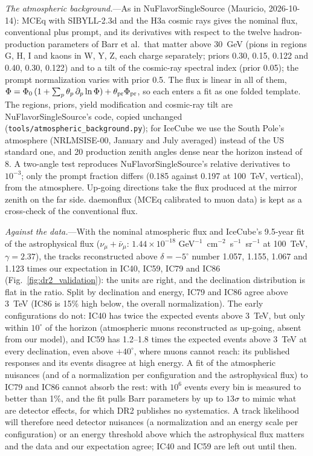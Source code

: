 \documentclass[11pt,a4paper]{article}
\newcommand{\file}[1]{\nolinkurl{#1}}
\begin{document}
\textit{The atmospheric background.}---As in NuFlavorSingleSource (Mauricio, 2026-10-14): MCEq with SIBYLL-2.3d and
the H3a cosmic rays gives the nominal flux, conventional plus prompt, and its derivatives with respect to the
twelve hadron-production parameters of Barr et al.\ that matter above 30~GeV (pions in regions G, H, I and kaons
in W, Y, Z, each charge separately; priors 0.30, 0.15, 0.122 and 0.40, 0.30, 0.122) and to a tilt of the cosmic-ray
spectral index (prior 0.05); the prompt normalization varies with prior 0.5. The flux is linear in all of them,
$\Phi = \Phi_0\,(1 + \sum_p \theta_p\, \partial_p \ln\Phi) + \theta_{\rm pr}\Phi_{\rm pr}$, so each enters a fit as one
folded template. The regions, priors, yield modification and cosmic-ray tilt are NuFlavorSingleSource's code,
copied unchanged (\file{tools/atmospheric\_background.py}); for IceCube we use the South Pole's atmosphere
(NRLMSISE-00, January and July averaged) instead of the US standard one, and 20 production zenith angles dense near
the horizon instead of 8. A two-angle test reproduces NuFlavorSingleSource's relative derivatives to $10^{-3}$;
only the prompt fraction differs (0.185 against 0.197 at 100~TeV, vertical), from the atmosphere. Up-going
directions take the flux produced at the mirror zenith on the far side. daemonflux (MCEq calibrated to muon data)
is kept as a cross-check of the conventional flux.

\textit{Against the data.}---With the nominal atmospheric flux and IceCube's 9.5-year fit of the astrophysical
flux ($\nu_\mu+\bar\nu_\mu$: $1.44\times10^{-18}$ GeV$^{-1}$~cm$^{-2}$~s$^{-1}$~sr$^{-1}$ at 100~TeV, $\gamma = 2.37$),
the tracks reconstructed above $\delta = -5^\circ$ number 1.057, 1.155, 1.067 and 1.123 times our expectation in IC40,
IC59, IC79 and IC86 (Fig.~\ref{fig:dr2_validation}): the units are right, and the declination distribution is flat
in the ratio. Split by declination and energy, IC79 and IC86 agree above 3~TeV (IC86 is 15\% high below, the
overall normalization). The early configurations do not: IC40 has twice the expected events above 3~TeV, but only
within $10^\circ$ of the horizon (atmospheric muons reconstructed as up-going, absent from our model), and IC59 has
1.2--1.8 times the expected events above 3~TeV at every declination, even above $+40^\circ$, where muons cannot
reach: its published responses and its events disagree at high energy. A fit of the atmospheric nuisances (and of a
normalization per configuration and the astrophysical flux) to IC79 and IC86 cannot absorb the rest: with $10^6$
events every bin is measured to better than 1\%, and the fit pulls Barr parameters by up to $13\sigma$ to mimic what
are detector effects, for which DR2 publishes no systematics. A track likelihood will therefore need detector
nuisances (a normalization and an energy scale per configuration) or an energy threshold above which the
astrophysical flux matters and the data and our expectation agree; IC40 and IC59 are left out until then.
\end{document}
